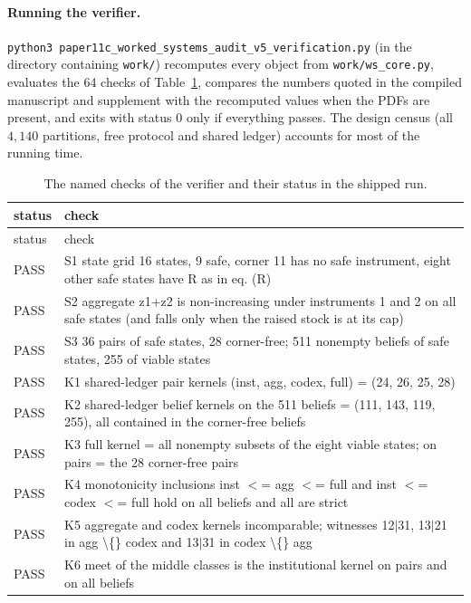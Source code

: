 \documentclass[11pt,a4paper]{article}
\theoremstyle{plain}
\theoremstyle{definition}
\theoremstyle{remark}
\newcommand{\NCHECKS}{64}
\begin{document}
\paragraph{Running the verifier.}
\texttt{python3 paper11c\_worked\_systems\_audit\_v5\_verification.py} (in the directory containing \texttt{work/}) recomputes every object from \texttt{work/ws\_core.py}, evaluates the \NCHECKS{} checks of Table~\ref{tab:checks}, compares the numbers quoted in the compiled manuscript and supplement with the recomputed values when the PDFs are present, and exits with status $0$ only if everything passes. The design census (all $4{,}140$ partitions, free protocol and shared ledger) accounts for most of the running time.

\begin{longtable}{lp{}}
\caption{The named checks of the verifier and their status in the shipped run.}\label{tab:checks}\\
\toprule
status & check \\
\midrule
\endfirsthead
\toprule
status & check \\
\midrule
\endhead
\bottomrule
\endfoot
PASS & S1 state grid 16 states, 9 safe, corner 11 has no safe instrument, eight other safe states have R as in eq. (R) \\
PASS & S2 aggregate z1+z2 is non-increasing under instruments 1 and 2 on all safe states (and falls only when the raised stock is at its cap) \\
PASS & S3 36 pairs of safe states, 28 corner-free; 511 nonempty beliefs of safe states, 255 of viable states \\
PASS & K1 shared-ledger pair kernels (inst, agg, codex, full) = (24, 26, 25, 28) \\
PASS & K2 shared-ledger belief kernels on the 511 beliefs = (111, 143, 119, 255), all contained in the corner-free beliefs \\
PASS & K3 full kernel = all nonempty subsets of the eight viable states; on pairs = the 28 corner-free pairs \\
PASS & K4 monotonicity inclusions inst $<$= agg $<$= full and inst $<$= codex $<$= full hold on all beliefs and all are strict \\
PASS & K5 aggregate and codex kernels incomparable; witnesses 12$|$31, 13$|$21 in agg \textbackslash\{\} codex and 13$|$31 in codex \textbackslash\{\} agg \\
PASS & K6 meet of the middle classes is the institutional kernel on pairs and on all beliefs \\

\end{longtable}
\end{document}
